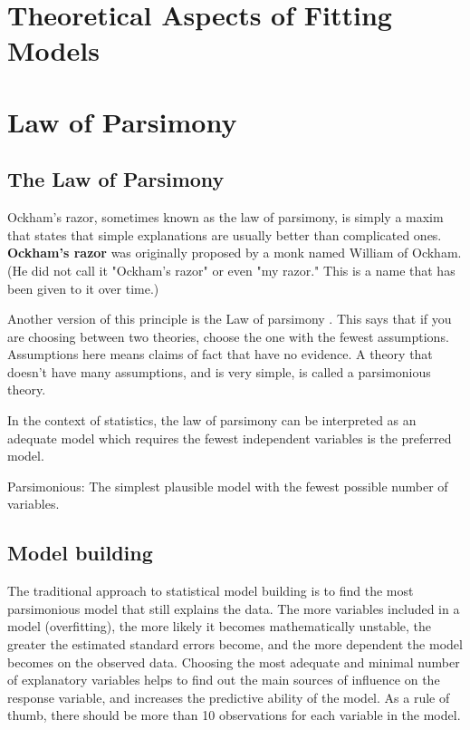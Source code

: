 \documentclass[a4paper,12pt]{article}
\begin{document}
\tableofcontents


\section{Theoretical Aspects of Fitting Models}

\section{Law of Parsimony}
\subsection{The Law of Parsimony}
Ockham's razor, sometimes known as the law of parsimony, is simply a maxim that states that simple explanations are usually better than complicated ones. \textbf{Ockham's razor} was originally proposed by a monk named William of Ockham. (He did not call it "Ockham's razor" or even "my razor." This is a name that has been given to it over time.)

Another version of this principle is the Law of parsimony . This says that if you are choosing between two theories, choose the one with the fewest assumptions. Assumptions here means claims of fact that have no evidence.
A theory that doesn't have many assumptions, and is very simple, is called a parsimonious theory.

In the context of statistics, the law of parsimony can be interpreted as an adequate model which requires the fewest independent variables is the preferred model.
\begin{framed}
	Parsimonious: The simplest plausible model with the fewest possible number of variables.
\end{framed}

\subsection{Model building}

The traditional approach to statistical model building is to find the most parsimonious model that still explains the data. The more variables included in a model (overfitting), the more likely it becomes mathematically unstable, the greater the estimated standard errors become, and the more dependent the model becomes on the observed data. Choosing the most adequate and minimal number of explanatory variables helps to find out the main sources of influence on the response variable, and increases the predictive ability of the model. As a rule of thumb, there should be more than 10 observations for each variable in the model.
%
\end{document}
